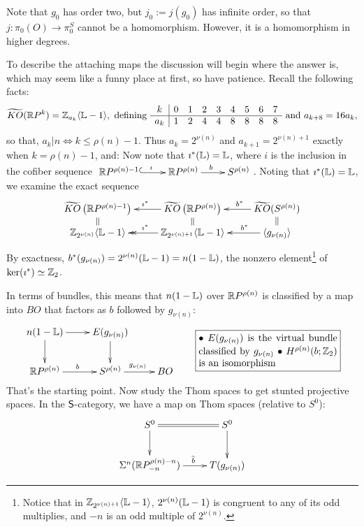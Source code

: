 Note that $g_0$ has order two, but $j_0:=j(g_0)$ has infinite order, so that $j:\pi_0(O)\to\pi^S_0$ cannot be a homomorphism. However, it is a homomorphism in higher degrees.

To describe the attaching maps the discussion will begin where the answer is, which may seem like a funny place at first, so have patience.  Recall the following facts:
\[\widetilde{KO}(\mathbb{R} P^k)=\mathbb{Z}_{a_k}\langle \mathbb{L}-1\rangle,\text{ defining }\begin{array}{c|cccccccc}
k&0&1&2&3&4&5&6&7\\\hline
a_k&1&2&4&4&8&8&8&8
\end{array}\text{ and }a_{k+8}=16a_k,\]
so that, $a_k|n\iff k\leq\rho(n)-1$. Thus $a_k=2^{\nu(n)}$ and $a_{k+1}=2^{\nu(n)+1}$ exactly when $k=\rho(n)-1$, and:
Now note that $\imath^*(\mathbb{L})=\mathbb{L}$, where $i$ is the inclusion in the cofiber sequence
$\xymatrix{
\RP^{\rho(n) - 1} \ar@{^{(}->}[r]^\imath& \RP^{\rho(n)} \ar[r]^b& S^{\rho(n)}
}$.
Noting that $\imath^*(\mathbb{L})=\mathbb{L}$,
we examine the exact sequence
\[\xymatrix@R=.2cm{
\widetilde{KO} \left( \RP^{\rho(n) - 1} \right)&\ar[l]_{\imath^*}\widetilde{KO} \left( \RP^{\rho(n)} \right)&\ar[l]_{\ \ \ b^*}\widetilde{KO} (S^{\rho(n)})\\
\Z_{2^{\nu(n)}} \langle \bundle L - 1 \rangle\ar@{=}[u]&\ar@{->>}[l]_{\imath^*}\Z_{2^{\nu(n) + 1}} \langle \bundle L - 1 \rangle\ar@{=}[u]&\ar[l]_{\qquad b^*}\langle g_{\nu(n)}\rangle\ar@{=}[u]
}\]
By exactness, $b^*(g_{\nu(n)})=2^{\nu(n)}(\mathbb{L} - 1)=n(1-\mathbb{L})$, the nonzero element\footnote{Notice that in $\mathbb{Z}_{2^{\nu(n) + 1}} \langle \mathbb{L} - 1\rangle$, $2^{\nu(n)}(\mathbb{L} - 1)$ is congruent to any of its odd multiplies, and $-n$ is an odd multiple of $2^{\nu(n)}$.} of $\ker(\imath^*)\simeq\mathbb{Z}_2$.

  In terms of bundles, this means that $n(1-\mathbb{L})$ over $\mathbb{R} P^{\rho(n)}$ is classified by a map into $BO$ that factors as $b$ followed by $g_{\nu(n)}$:
\[\xymatrix{
\ar[d]n(1-\bundle L) \ar[r] & E(g_{\nu(n)})\ar[d] \\
\RP^{\rho(n)}\ar[r]^b & S^{\rho(n)} \ar[r]^{g_{\nu(n)}} & BO
}\qquad\fbox{\raisebox{-.65cm}{\begin{minipage}{5cm}
\Bullet $E(g_{\nu(n)})$ is the virtual bundle classified by $g_{\nu(n)}$

\Bullet $H^{\rho(n)}(b;\Z_2)$ is an isomorphism
\end{minipage}}}\]
That's the starting point.  Now study the Thom spaces to get stunted projective spaces.  In the $\mathsf{S}$-category, we have a map on Thom spaces (relative to $S^0$):
\[\xymatrix{S^0\ar[d]\ar@{=}[r]&S^0\ar[d]\\
\Suspend^n(\RP^{\rho(n)-n}_{-n}) \ar[r]^{\ \ \ \widetilde b}& T(g_{\nu(n)})
}\]


